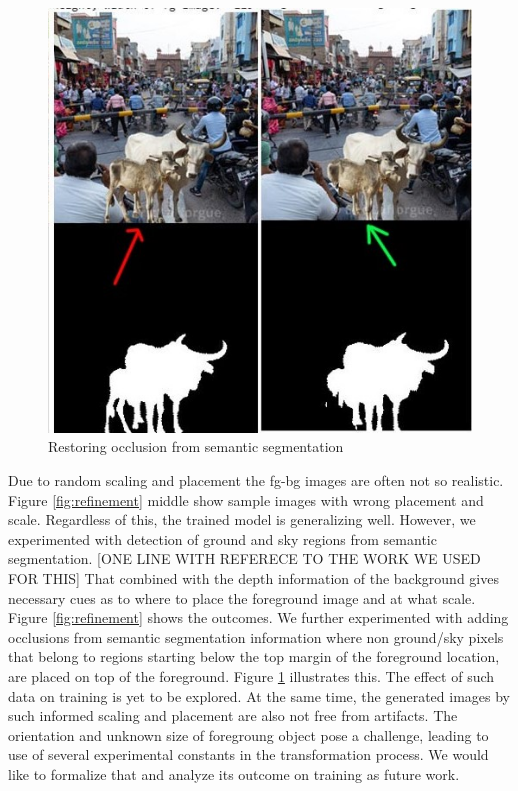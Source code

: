 \documentclass[review]{cvpr}
\begin{document}
\begin{figure}
  \begin{center}
  \includegraphics[width=1.0\linewidth]{occlusion.jpg}
  \caption{Restoring occlusion from semantic segmentation}
  \end{center}
  \label{fig:occlusion}
\end{figure}

Due to random scaling and placement the fg-bg images are often not so realistic. Figure \ref{fig:refinement} middle show sample images with wrong placement and scale. Regardless of this, the trained model is generalizing well. However, we experimented with detection of ground and sky regions from semantic segmentation. [ONE LINE WITH REFERECE TO THE WORK WE USED FOR THIS] That combined with the depth information of the background gives necessary cues as to where to place the foreground image and at what scale. Figure \ref{fig:refinement} shows the outcomes. We further experimented with adding occlusions from semantic segmentation information where non ground/sky pixels that belong to regions starting below the top margin of the foreground location, are placed on top of the foreground. Figure \ref{fig:occlusion} illustrates this. The effect of such data on training is yet to be explored. At the same time, the generated images by such informed scaling and placement are also not free from artifacts. The orientation and unknown size of foregroung object pose a challenge, leading to use of several experimental constants in the transformation process. We would like to formalize that and analyze its outcome on training as future work.
\end{document}
